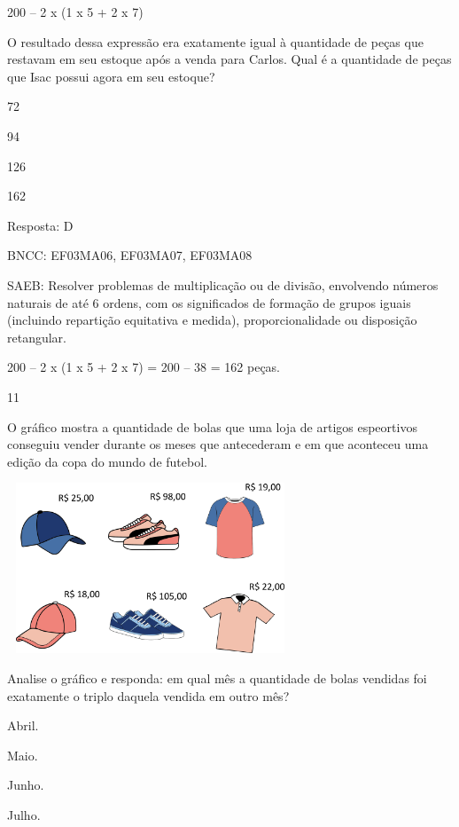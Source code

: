 \begin{escolha}
{\begin{escolha}
{200 -- 2 x (1 x 5 + 2 x 7)

O resultado dessa expressão era exatamente igual à quantidade de peças
que restavam em seu estoque após a venda para Carlos. Qual é a
quantidade de peças que Isac possui agora em seu estoque?

\begin{escolha}
\item
  72
\item
  94
\item
  126
\item
  162
\end{escolha}

Resposta: D

BNCC: EF03MA06, EF03MA07, EF03MA08

SAEB: Resolver problemas de multiplicação ou de divisão, envolvendo números
naturais de até 6 ordens, com os significados de formação de grupos
iguais (incluindo repartição equitativa e medida), proporcionalidade ou
disposição retangular.

200 -- 2 x (1 x 5 + 2 x 7) = 200 -- 38 = 162 peças.

\num{11}

O gráfico mostra a quantidade de bolas que uma loja de artigos
espeortivos conseguiu vender durante os meses que antecederam e em que
aconteceu uma edição da copa do mundo de futebol.


\includegraphics[width=3.36538in,height=2.00040in]{media/image120.png}

Analise o gráfico e responda: em qual mês a quantidade de bolas vendidas foi exatamente o triplo daquela vendida em outro mês?

\begin{escolha}
\item
  Abril.
\item
  Maio.
\item
  Junho.
\item
  Julho.
\end{escolha}

}
\end{escolha}}
\end{escolha}
